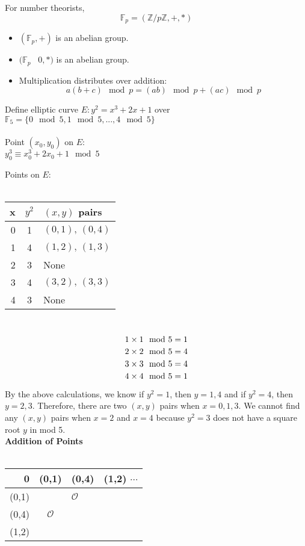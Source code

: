 For number theorists, 
$$\mathbb{F}_{p}=(\mathbb{Z}/p\mathbb{Z}, +, *)$$
\begin{itemize}
\item $(\mathbb{F}_{p}, +)$ is an abelian group.
\item $(\mathbb{F}_{p}$ \ ${0}, *)$ is an abelian group.
\item Multiplication distributes over addition:\\
$$a(b+c)\mod{p}=(ab)\mod{p}+(ac)\mod{p}$$
\end{itemize}
\begin{example}

Define elliptic curve $E: y^{2}=x^{3}+2x+1$ over $\mathbb{F}_{5}= \{0\mod{5},1\mod{5},...,4\mod{5}\}$
\\
\\Point $({x}_{0}, {y}_{0})$ on $E$:
\\${y}_{0}^{3} \equiv {x}_{0}^{3}+2{x}_{0}+1\mod{5}$
\end{example}

Points on $E$:
\\
\\\begin{tabular}{r|c|l}
x & $y^{2}$ & $(x,y)$ pairs\\
\hline
0 & 1 & $(0,1), \, (0,4)$ \\
1 & 4 & $(1,2),  \, (1,3) $\\
2 & 3 & None \\
3 & 4 & $(3,2), \,  (3,3)$\\
4 & 3 & None \\
\end{tabular}
\\

$$1 \times 1 \mod{5} = 1\\$$
$$2 \times 2 \mod{5} = 4\\$$
$$3 \times 3 \mod{5} = 4\\$$
$$4 \times 4 \mod{5} = 1\\$$

By the above calculations, we know if $y^2 = 1$, then $y = 1, 4$ and if $y^2 = 4$, then $y = 2, 3$. Therefore, there are two $(x, y)$ pairs when $x = 0, 1, 3$. We cannot find any $(x, y)$ pairs when $x = 2$ and $x = 4$ because $y^2 = 3$ does not have a square root $y$ in mod 5.\\

\textbf{Addition of Points}
\\
\\\begin{tabular}{r|cll}
0 & (0,1) & (0,4) & (1,2) $\cdots$\\
\hline
(0,1) & & $\mathcal{O}$ &\\
(0,4) & $\mathcal{O}$ & & \\
(1,2) & & & \\
\end{tabular}
\\
\\

